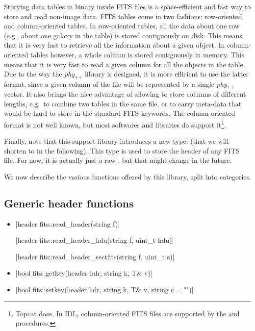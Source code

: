 \documentclass[12pt]{report}
\newcommand{\phypp}{\textit{phy}$_{\text{++}}$\xspace}
\begin{document}
Storying data tables in binary inside FITS files is a space-efficient and fast way to store and read non-image data. FITS tables come in two fashions: row-oriented and column-oriented tables. In row-oriented tables, all the data about one row (e.g., about one galaxy in the table) is stored contiguously on disk. This means that it is very fast to retrieve all the information about a given object. In column-oriented tables however, a whole column is stored contiguously in memory. This means that it is very fast to read a given column for all the objects in the table. Due to the way the \phypp library is designed, it is more efficient to use the latter format, since a given column of the file will be represented by a single \phypp vector. It also brings the nice advantage of allowing to store columns of different lengths, e.g.~to combine two tables in the same file, or to carry meta-data that would be hard to store in the standard FITS keywords. The column-oriented format is not well known, but most softwares and libraries do support it\footnote{Topcat does. In IDL, column-oriented FITS files are supported by the  and  procedures.}.

Finally, note that this support library introduces a new type:  (that we will shorten to  in the following). This type is used to store the header of any FITS file. For now, it is actually just a raw , but that might change in the future.

We now describe the various functions offered by this library, split into categories.

\subsection{Generic header functions \label{SEC:support:fits:header}}

\begin{itemize}
\item \cppinline|header fits::read_header(string f)| 

\cppinline|header fits::read_header_hdu(string f, uint_t hdu)|

\cppinline|header fits::read_header_sectfits(string f, uint_t s)|

\item \cppinline|bool fits::getkey(header hdr, string k, T& v)| 

\item \cppinline|bool fits::setkey(header hdr, string k, T& v, string c = "")| 


\end{itemize}
\end{document}
